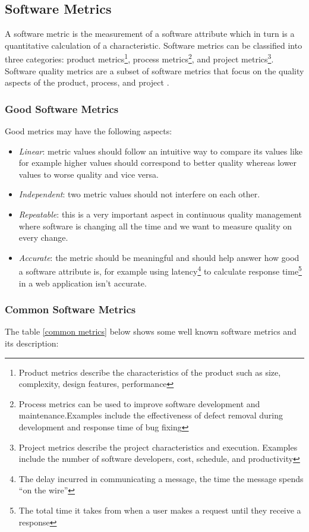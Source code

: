 \subsection{Software Metrics}
A software metric is the measurement of a software attribute which in turn is a quantitative calculation of a characteristic. Software metrics can be classified into three categories: product metrics\footnote{Product metrics describe the characteristics of the product such as size, complexity, design features, performance}, process metrics\footnote{Process metrics can be used to improve software development and maintenance.Examples include the effectiveness of defect removal during development and response time of bug fixing}, and project metrics\footnote{Project metrics describe the project characteristics and execution. Examples include the number of
software developers, cost, schedule, and productivity}. Software quality metrics are a subset of software metrics that focus on the quality aspects of the product, process, and project \citep{Kan 2002}.


\subsubsection{Good Software Metrics}
Good metrics may have the following aspects:

\begin{itemize}
  \item \emph{Linear}: metric values should follow an intuitive way to compare its values like for example higher values should correspond to better quality whereas lower values to worse quality and vice versa. 
  \item \emph{Independent}: two metric values should not interfere on each other.
  \item \emph{Repeatable}: this is a very important aspect in continuous quality management where software is changing all the time and we want to measure quality on every change.
  \item \emph{Accurate}: the metric should be meaningful and should help answer how good a software attribute is, for example using latency\footnote{The delay incurred in communicating a message, the time the message spends “on the wire”} to calculate response time\footnote{The total time it takes from when a user makes a request until they receive a response} in a web application isn't accurate.       
\end{itemize}


\subsubsection{Common Software Metrics}
The table \ref{common metrics} below shows some well known software metrics and its description:

